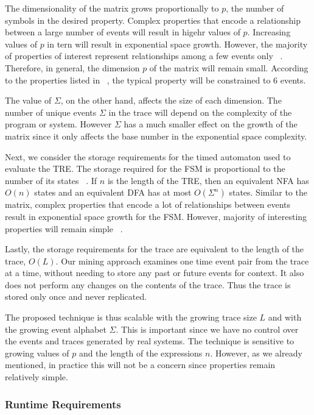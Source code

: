 \documentclass[]{sigplanconf}
\begin{document}
The dimensionality of the matrix grows proportionally to $p$, the number of symbols in the desired property.
Complex properties that encode a relationship between a large number of events will result in higehr values of $p$.
Increasing values of $p$ in tern will result in exponential space growth.
However, the majority of properties of interest represent relationships among a few events only ~\cite{evans1, dwyer1999patterns}.
Therefore, in general, the dimension $p$ of the matrix will remain small.
According to the properties listed in ~\cite{dwyer1999patterns, dwyer2}, the typical property will be constrained to 6 events.

The value of $\Sigma$, on the other hand, affects the size of each dimension.
The number of unique events $\Sigma$ in the trace will depend on the complexity of the program or system.
However $\Sigma$ has a much smaller effect on the growth of the matrix since it only affects the base number in the
exponential space complexity.


Next, we consider the storage requirements for the timed automaton used to evaluate the TRE.
The storage required for the FSM is proportional to the number of its states ~\cite{book1}.
If $n$ is the length of the TRE, then an equivalent NFA has $O(n)$ states and an equivalent DFA has at most $O(\Sigma^n)$ states. Similar to the matrix, complex properties that encode a lot of relationships between events result in exponential space growth for the FSM. However, majority of interesting properties will remain simple ~\cite{dwyer1999patterns}.


Lastly, the storage requirements for the trace are equivalent to the length of the trace, $O(L)$.
Our mining approach examines one time event pair from the trace at a time, without needing to
store any past or future events for context. It also does not perform any changes on the
contents of the trace. Thus the trace is stored only once and never replicated.


The proposed technique is thus scalable with the growing trace size $L$ and with the growing event alphabet $\Sigma$. This is important since we have no control over the events and traces generated by real systems. The technique is sensitive to growing values of $p$ and the length of the expressions $n$. However, as we already mentioned, in practice this will not be a concern since properties remain relatively simple.

\subsubsection{Runtime Requirements}
\end{document}
